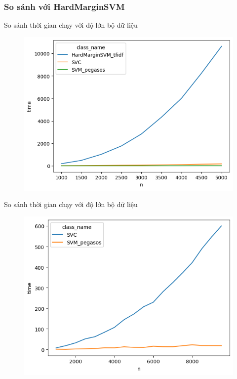 \documentclass[serif, aspectratio=169]{beamer}
\begin{document}
	\subsubsection{So sánh với HardMarginSVM}
	\begin{frame}{So sánh thời gian chạy với độ lớn bộ dữ liệu}
		\begin{figure}
			\centering
			\includegraphics[width=0.6\linewidth]{pic/hardmargin-vs-pegasos-n-time.png}
			\label{fig:hardmargin-vs-pegasos-n-time.}
		\end{figure}
	\end{frame}
	
	\begin{frame}{So sánh thời gian chạy với độ lớn bộ dữ liệu}
		\begin{figure}
			\centering
			\includegraphics[width=0.6\linewidth]{pic/pegasos-vs-svc-n-time.png}
			\label{fig:pegasos-vs-svc-n-time}
		\end{figure}
	\end{frame}
	
\end{document}
